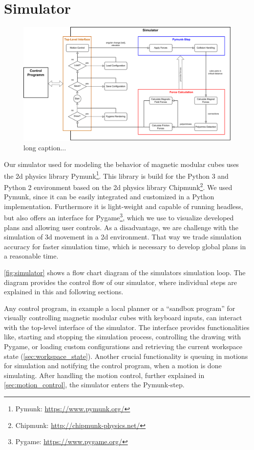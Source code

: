 \chapter{Simulator}
\label{chap:sim}

\begin{figure}
	\centering
	\includegraphics[width=1\textwidth]{figures/simulator_controlflow.pdf}
	\caption[Control flow of the simulator]{long caption...}
	\label{fig:simulator}
\end{figure}

Our simulator used for modeling the behavior of magnetic modular cubes uses the 2d physics library Pymunk\footnote{Pymunk: \url{https://www.pymunk.org/}}.
This library is build for the Python 3 and Python 2 environment based on the 2d physics library Chipmunk\footnote{Chipmunk: \url{http://chipmunk-physics.net/}}.
We used Pymunk, since it can be easily integrated and customized in a Python implementation.
Furthermore it is light-weight and capable of running headless, but also offers an interface for Pygame\footnote{Pygame: \url{https://www.pygame.org/}}, which we use to visualize developed plans and allowing user controls.
As a disadvantage, we are challenge with the simulation of 3d movement in a 2d environment.
That way we trade simulation accuracy for faster simulation time, which is necessary to develop global plans in a reasonable time.

\autoref{fig:simulator} shows a flow chart diagram of the simulators simulation loop.
The diagram provides the control flow of our simulator, where individual steps are explained in this and following sections.

Any control program, in example a local planner or a ``sandbox program'' for visually controlling magnetic modular cubes with keyboard inputs, can interact with the top-level interface of the simulator.
The interface provides functionalities like, starting and stopping the simulation process, controlling the drawing with Pygame, or loading custom configurations and retrieving the current workspace state (\autoref{sec:workspace_state}).
Another crucial functionality is queuing in motions for simulation and notifying the control program, when a motion is done simulating.
After handling the motion control, further explained in \autoref{sec:motion_control}, the simulator enters the Pymunk-step.

